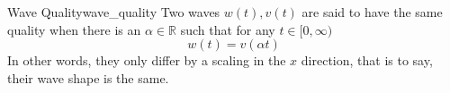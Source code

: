\begin{definition}{Wave Quality}{wave_quality}
  Two waves $ w\left(t\right), v\left(t\right)$ are said to have the same quality when there is an $ \alpha \in \mathbb{R}$ such that for any $ t \in [0, \infty)$ 
  \[
  w\left(t\right) =  v\left(\alpha t\right)
  \]
  In other words, they only differ by a scaling in the $x$ direction, that is to say, their wave shape is the same. 

\end{definition}
